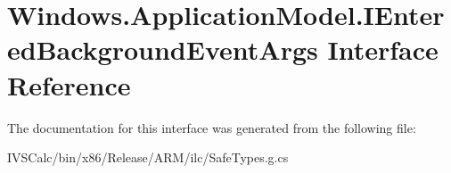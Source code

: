 \hypertarget{interface_windows_1_1_application_model_1_1_i_entered_background_event_args}{}\section{Windows.\+Application\+Model.\+I\+Entered\+Background\+Event\+Args Interface Reference}
\label{interface_windows_1_1_application_model_1_1_i_entered_background_event_args}


The documentation for this interface was generated from the following file\+:\begin{DoxyCompactItemize}
\item 
I\+V\+S\+Calc/bin/x86/\+Release/\+A\+R\+M/ilc/Safe\+Types.\+g.\+cs\end{DoxyCompactItemize}
